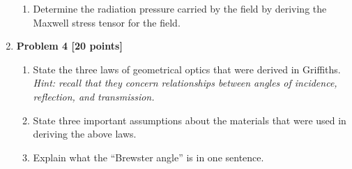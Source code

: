 \documentclass[fleqn]{article}
\begin{document}
\begin{enumerate}
\begin{enumerate}

        \item Determine the radiation pressure carried by the field by deriving the Maxwell stress tensor for
        the field.

        
      \end{enumerate}

    \item \textbf{Problem 4 [20 points]}
    \begin{enumerate}
      \item State the three laws of geometrical optics that were derived in Griffiths. \emph{Hint: recall that they
      concern relationships between angles of incidence, reflection, and transmission.}



      \item State three important assumptions about the materials that were used in deriving the above laws.



      \item Explain what the “Brewster angle” is in one sentence.

      
    \end{enumerate}

  \end{enumerate}
\end{document}
